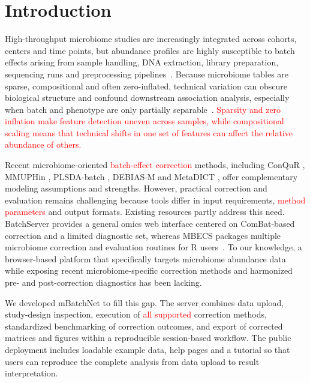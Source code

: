 \documentclass[webpdf,contemporary,large,numbered]{oup-authoring-template}
\providecommand{\rev}[1]{\textcolor{red}{#1}}
\begin{document}
\maketitle

\section{Introduction}
High-throughput microbiome studies are increasingly integrated across cohorts, centers and time points, but abundance profiles are highly susceptible to batch effects arising from sample handling, DNA extraction, library preparation, sequencing runs and preprocessing pipelines~\citep{Costea2017FecalProcessing,McLaren2019MetagenomicBias,Sinha2017MBQC}. Because microbiome tables are sparse, compositional and often zero-inflated, technical variation can obscure biological structure and confound downstream association analysis, especially when batch and phenotype are only partially separable~\citep{Ling2022ConQuR}. \rev{Sparsity and zero inflation make feature detection uneven across samples, while compositional scaling means that technical shifts in one set of features can affect the relative abundance of others.}

Recent microbiome-oriented \rev{batch-effect correction} methods, including ConQuR \citep{Ling2022ConQuR}, MMUPHin \citep{Ma2022MMUPHin}, PLSDA-batch \citep{Wang2023PLSDABatch}, DEBIAS-M \citep{Austin2025DEBIASM} and MetaDICT \citep{Yuan2025MetaDICT}, offer complementary modeling assumptions and strengths. However, practical correction and evaluation remains challenging because tools differ in input requirements, \rev{method parameters} and output formats. Existing resources partly address this need. BatchServer \citep{Zhu2021BatchServer} provides a general omics web interface centered on ComBat-based correction and a limited diagnostic set, whereas MBECS packages multiple microbiome correction and evaluation routines for R users~\citep{Olbrich2023MBECS}. To our knowledge, a browser-based platform that specifically targets microbiome abundance data while exposing recent microbiome-specific correction methods and harmonized pre- and post-correction diagnostics has been lacking.

We developed mBatchNet to fill this gap. The server combines data upload, study-design inspection, execution of \rev{all supported} correction methods, standardized benchmarking of correction outcomes, and export of corrected matrices and figures within a reproducible session-based workflow. The public deployment includes loadable example data, help pages and a tutorial so that users can reproduce the complete analysis from data upload to result interpretation.
\end{document}
